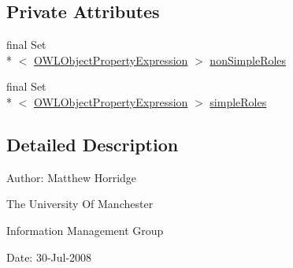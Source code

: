 \subsection*{Private Attributes}
\begin{DoxyCompactItemize}
\item 
final Set\\*
$<$ \hyperlink{interfaceorg_1_1semanticweb_1_1owlapi_1_1model_1_1_o_w_l_object_property_expression}{O\-W\-L\-Object\-Property\-Expression} $>$ \hyperlink{classorg_1_1semanticweb_1_1owlapi_1_1profiles_1_1_o_w_l2_profile_report_ab2b4842785549a5695bda2356084d55d}{non\-Simple\-Roles}
\item 
final Set\\*
$<$ \hyperlink{interfaceorg_1_1semanticweb_1_1owlapi_1_1model_1_1_o_w_l_object_property_expression}{O\-W\-L\-Object\-Property\-Expression} $>$ \hyperlink{classorg_1_1semanticweb_1_1owlapi_1_1profiles_1_1_o_w_l2_profile_report_a74fba7c1e8d24b9d655a833ba2c64d16}{simple\-Roles}
\end{DoxyCompactItemize}


\subsection{Detailed Description}
Author\-: Matthew Horridge\par
 The University Of Manchester\par
 Information Management Group\par
 Date\-: 30-\/\-Jul-\/2008\par
\par
 

